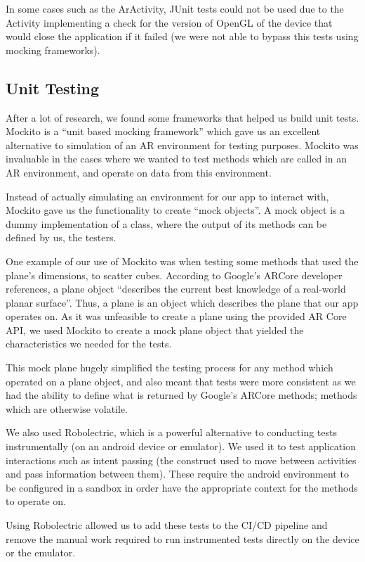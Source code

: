 \documentclass{l3proj}
\begin{document}
In some cases such as the ArActivity, JUnit tests could not be used due to the Activity
implementing a check for the version of OpenGL of the device that would close the
application if it failed (we were not able to bypass this tests using mocking frameworks).

\subsection{Unit Testing}
After a lot of research, we found some frameworks that helped us build unit tests. 
Mockito is a “unit based mocking framework”\cite{Mockito} which gave us an excellent alternative 
to simulation of an AR environment for testing purposes. Mockito was invaluable in 
the cases where we wanted to test methods which are called in an AR environment, 
and operate on data from this environment.

Instead of actually simulating an environment for our app to interact with, Mockito 
gave us the functionality to create “mock objects”. A mock object is a dummy 
implementation of a class, where the output of its methods can be defined by us, 
the testers.

One example of our use of Mockito was when testing some methods that used the plane's dimensions,
to scatter cubes. According to Google's ARCore developer references, a plane object “describes the 
current best knowledge of a real-world planar surface”\cite{Plane}. Thus, a plane is an object 
which describes the plane that our app operates on. As it was unfeasible to create a plane
using the provided AR Core API, we used Mockito to create a mock plane object
that yielded the characteristics we needed for the tests\cite{MockitoRerence}.

This mock plane hugely simplified the testing process for any method which 
operated on a plane object, and also meant that tests were more consistent as 
we had the ability to define what is returned by Google's ARCore methods; methods 
which are otherwise volatile.

We also used Robolectric, which is a powerful alternative to conducting tests instrumentally (on 
an android device or emulator)\cite{Roboelectric}. We used it to test application interactions
such as intent passing (the construct used to move between activities and pass 
information between them). These require the android environment to be configured in
a sandbox in order have the appropriate context for the methods to operate on.

Using Robolectric allowed us to add these tests to the CI/CD pipeline and remove
the manual work required to run instrumented tests directly on the device or the
emulator.
\end{document}
